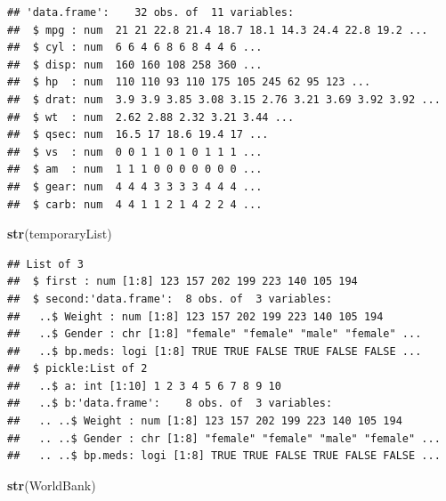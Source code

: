 \documentclass[
]{krantz}
\newenvironment{Shaded}{\begin{snugshade}}{\end{snugshade}}
\newcommand{\KeywordTok}[1]{\textcolor[rgb]{0.13,0.29,0.53}{\textbf{#1}}}
\newcommand{\NormalTok}[1]{#1}
\begin{document}
\begin{verbatim}
## 'data.frame':    32 obs. of  11 variables:
##  $ mpg : num  21 21 22.8 21.4 18.7 18.1 14.3 24.4 22.8 19.2 ...
##  $ cyl : num  6 6 4 6 8 6 8 4 4 6 ...
##  $ disp: num  160 160 108 258 360 ...
##  $ hp  : num  110 110 93 110 175 105 245 62 95 123 ...
##  $ drat: num  3.9 3.9 3.85 3.08 3.15 2.76 3.21 3.69 3.92 3.92 ...
##  $ wt  : num  2.62 2.88 2.32 3.21 3.44 ...
##  $ qsec: num  16.5 17 18.6 19.4 17 ...
##  $ vs  : num  0 0 1 1 0 1 0 1 1 1 ...
##  $ am  : num  1 1 1 0 0 0 0 0 0 0 ...
##  $ gear: num  4 4 4 3 3 3 3 4 4 4 ...
##  $ carb: num  4 4 1 1 2 1 4 2 2 4 ...
\end{verbatim}

\begin{Shaded}
\begin{Highlighting}[]
\KeywordTok{str}\NormalTok{(temporaryList)}
\end{Highlighting}
\end{Shaded}

\begin{verbatim}
## List of 3
##  $ first : num [1:8] 123 157 202 199 223 140 105 194
##  $ second:'data.frame':  8 obs. of  3 variables:
##   ..$ Weight : num [1:8] 123 157 202 199 223 140 105 194
##   ..$ Gender : chr [1:8] "female" "female" "male" "female" ...
##   ..$ bp.meds: logi [1:8] TRUE TRUE FALSE TRUE FALSE FALSE ...
##  $ pickle:List of 2
##   ..$ a: int [1:10] 1 2 3 4 5 6 7 8 9 10
##   ..$ b:'data.frame':    8 obs. of  3 variables:
##   .. ..$ Weight : num [1:8] 123 157 202 199 223 140 105 194
##   .. ..$ Gender : chr [1:8] "female" "female" "male" "female" ...
##   .. ..$ bp.meds: logi [1:8] TRUE TRUE FALSE TRUE FALSE FALSE ...
\end{verbatim}

\begin{Shaded}
\begin{Highlighting}[]
\KeywordTok{str}\NormalTok{(WorldBank)}
\end{Highlighting}
\end{Shaded}
\end{document}
